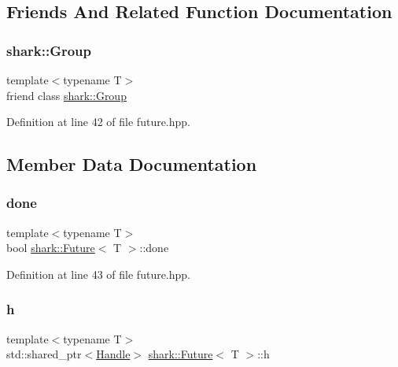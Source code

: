 \subsection{Friends And Related Function Documentation}
\hypertarget{structshark_1_1_future_a8e678e0244c103cad9467c2b743509bb}{}\label{structshark_1_1_future_a8e678e0244c103cad9467c2b743509bb} 
\subsubsection{\texorpdfstring{shark\+::\+Group}{shark::Group}}
{\footnotesize\ttfamily template$<$typename T$>$ \\
friend class \hyperlink{classshark_1_1_group}{shark\+::\+Group}\hspace{0.3cm}{\ttfamily [friend]}}



Definition at line 42 of file future.\+hpp.



\subsection{Member Data Documentation}
\hypertarget{structshark_1_1_future_ae873cf93e919c066f04ff337ce3a21e1}{}\label{structshark_1_1_future_ae873cf93e919c066f04ff337ce3a21e1} 
\subsubsection{\texorpdfstring{done}{done}}
{\footnotesize\ttfamily template$<$typename T$>$ \\
bool \hyperlink{structshark_1_1_future}{shark\+::\+Future}$<$ T $>$\+::done}



Definition at line 43 of file future.\+hpp.

\hypertarget{structshark_1_1_future_a54f00db085adbffb18b2e2ab9e3d4b32}{}\label{structshark_1_1_future_a54f00db085adbffb18b2e2ab9e3d4b32} 
\subsubsection{\texorpdfstring{h}{h}}
{\footnotesize\ttfamily template$<$typename T$>$ \\
std\+::shared\+\_\+ptr$<$\hyperlink{classshark_1_1_handle}{Handle}$>$ \hyperlink{structshark_1_1_future}{shark\+::\+Future}$<$ T $>$\+::h}



